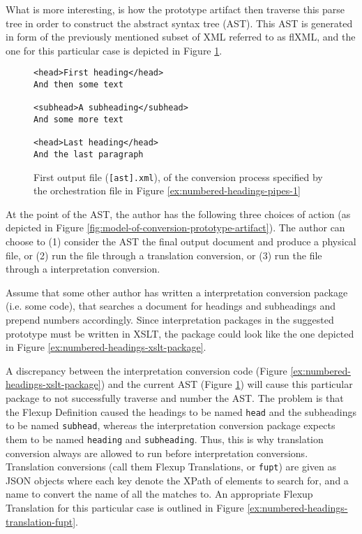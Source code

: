 \documentclass{scrreprt}
\begin{document}
What is more interesting, is how the prototype artifact then traverse this parse tree in order to construct the abstract syntax tree (AST). This AST is generated in form of the previously mentioned subset of XML referred to as flXML, and the one for this particular case is depicted in Figure \ref{ex:numbered-headings-flXML-ast-raw}.


\begin{figure}[h]
\begin{lstlisting}
<head>First heading</head>
And then some text

<subhead>A subheading</subhead>
And some more text

<head>Last heading</head>
And the last paragraph
\end{lstlisting}
\caption{First output file (\texttt{[ast].xml}), of the conversion process specified by the orchestration file in Figure \ref{ex:numbered-headings-pipes-1}}
\label{ex:numbered-headings-flXML-ast-raw}
\end{figure}

At the point of the AST, the author has the following three choices of action (as depicted in Figure \ref{fig:model-of-conversion-prototype-artifact}). The author can choose to (1) consider the AST the final output document and produce a physical file, or (2) run the file through a translation conversion, or (3) run the file through a interpretation conversion.

Assume that some other author has written a interpretation conversion package (i.e. some code), that searches a document for headings and subheadings and prepend numbers accordingly. Since interpretation packages in the suggested prototype must be written in XSLT, the package could look like the one depicted in Figure \ref{ex:numbered-headings-xslt-package}.

A discrepancy between the interpretation conversion code (Figure \ref{ex:numbered-headings-xslt-package}) and the current AST (Figure \ref{ex:numbered-headings-flXML-ast-raw}) will cause this particular package to not successfully traverse and number the AST. The problem is that the Flexup Definition caused the headings to be named \texttt{head} and the subheadings to be named \texttt{subhead}, whereas the interpretation conversion package expects them to be named \texttt{heading} and \texttt{subheading}. Thus, this is why translation conversion always are allowed to run before interpretation conversions. Translation conversions (call them Flexup Translations, or \texttt{fupt}) are given as JSON objects where each key denote the XPath of elements to search for, and a name to convert the name of all the matches to. An appropriate Flexup Translation for this particular case is outlined in Figure \ref{ex:numbered-headings-translation-fupt}.
\end{document}
